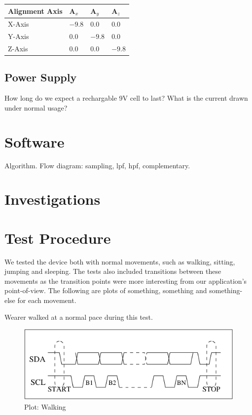 \documentclass[11pt, a4paper]{article}
\begin{document}
\begin{center}
   \begin{tabular}{llll}
      \hline
      Alignment Axis & A$_{x}$ & A$_{y}$ & A$_{z}$\\
      \hline
      X-Axis & $-9.8$ & $0.0$ & $0.0$ \\
      Y-Axis & $0.0$ & $-9.8$ & $0.0$ \\
      Z-Axis & $0.0$ & $0.0$ & $-9.8$ \\
      \hline
   \end{tabular}
\end{center}


\subsection{Power Supply}
How long do we expect a rechargable 9V cell to last? What is the current
drawn under normal usage?

\section{Software}
Algorithm.
Flow diagram: sampling, lpf, hpf, complementary.

\section{Investigations}


\section{Test Procedure}
We tested the device both with normal movements, such as walking, sitting,
jumping and sleeping. The tests also included transitions between these
movements as the transition points were more interesting from our
application's point-of-view. The following are plots of {\color{red}
something, something and something-else} for each movement.

\noindent Wearer walked at a normal pace during this test. 
\begin{figure}
    \centering
    \includegraphics[width=\linewidth]{I2C_Timing.pdf}
    \caption{Plot: Walking}
    \label{fig:walking}
\end{figure}
\end{document}
